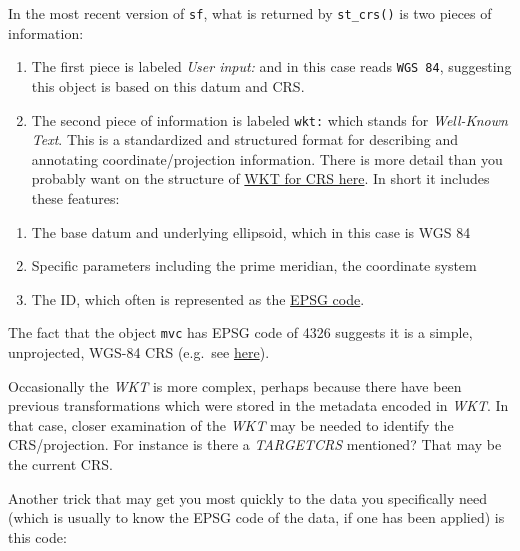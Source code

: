 \documentclass[
]{book}
\newenvironment{Shaded}{\begin{snugshade}}{\end{snugshade}}
\newcommand{\CommentTok}[1]{\textcolor[rgb]{0.56,0.35,0.01}{\textit{#1}}}
\newcommand{\FunctionTok}[1]{\textcolor[rgb]{0.00,0.00,0.00}{#1}}
\newcommand{\NormalTok}[1]{#1}
\newcommand{\SpecialCharTok}[1]{\textcolor[rgb]{0.00,0.00,0.00}{#1}}
\providecommand{\tightlist}{%
  \setlength{\itemsep}{0pt}\setlength{\parskip}{0pt}}
\begin{document}
In the most recent version of \texttt{sf}, what is returned by \texttt{st\_crs()} is two pieces of information:

\begin{enumerate}
\def\labelenumi{\arabic{enumi}.}
\tightlist
\item
  The first piece is labeled \emph{User input:} and in this case reads \texttt{WGS\ 84}, suggesting this object is based on this datum and CRS.
\item
  The second piece of information is labeled \texttt{wkt:} which stands for \emph{Well-Known Text}. This is a standardized and structured format for describing and annotating coordinate/projection information. There is more detail than you probably want on the structure of \href{http://docs.opengeospatial.org/is/12-063r5/12-063r5.html\#43}{WKT for CRS here}. In short it includes these features:
\end{enumerate}

\begin{enumerate}
\def\labelenumi{\alph{enumi}.}
\tightlist
\item
  The base datum and underlying ellipsoid, which in this case is WGS 84
\item
  Specific parameters including the prime meridian, the coordinate system
\item
  The ID, which often is represented as the \href{https://epsg.io/}{EPSG code}.
\end{enumerate}

The fact that the object \texttt{mvc} has EPSG code of 4326 suggests it is a simple, unprojected, WGS-84 CRS (e.g.~see \href{https://epsg.io/?q=4326}{here}).

Occasionally the \emph{WKT} is more complex, perhaps because there have been previous transformations which were stored in the metadata encoded in \emph{WKT}. In that case, closer examination of the \emph{WKT} may be needed to identify the CRS/projection. For instance is there a \emph{TARGETCRS} mentioned? That may be the current CRS.

Another trick that may get you most quickly to the data you specifically need (which is usually to know the EPSG code of the data, if one has been applied) is this code:

\begin{Shaded}
\end{Shaded}
\end{document}
